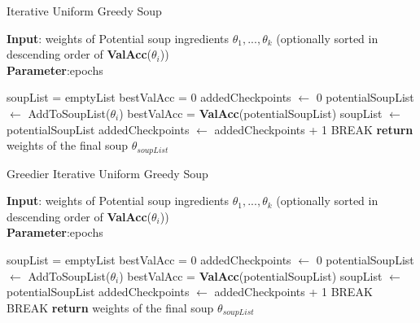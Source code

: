 \documentclass[10pt,twocolumn,letterpaper]{article}
\begin{document}
\begin{algorithm}[!htb]
\caption{Iterative Uniform Greedy Soup}
\label{alg:algorithm1}
\textbf{Input}: weights of Potential soup ingredients ${\theta_1, ..., \theta_k}$ (optionally sorted in descending order of \textbf{ValAcc}($\theta_i$))\\
\textbf{Parameter}:epochs\\
\begin{algorithmic}[1] %
\STATE soupList = emptyList
\STATE bestValAcc = 0
\STATE addedCheckpoints $\leftarrow$ 0
\STATE potentialSoupList $\leftarrow$ AddToSoupList($\theta_i$)
\STATE bestValAcc = \textbf{ValAcc}(potentialSoupList)
\STATE soupList $\leftarrow$ potentialSoupList
\STATE addedCheckpoints $\leftarrow$ addedCheckpoints + 1
\ENDIF
\ENDFOR
{}
\STATE BREAK
\ENDIF
{}
\ENDFOR
\STATE \textbf{return} weights of the final soup $\theta_{soupList}$
\end{algorithmic}
\end{algorithm}
\begin{algorithm}[!htb]
\caption{Greedier Iterative Uniform Greedy Soup}
\label{alg:algorithm2}
\textbf{Input}: weights of Potential soup ingredients ${\theta_1, ..., \theta_k}$ (optionally sorted in descending order of \textbf{ValAcc}($\theta_i$))\\
\textbf{Parameter}:epochs\\
\begin{algorithmic}[1] %
\STATE soupList = emptyList
\STATE bestValAcc = 0
\STATE addedCheckpoints $\leftarrow$ 0
\STATE potentialSoupList $\leftarrow$ AddToSoupList($\theta_i$)
\STATE bestValAcc = \textbf{ValAcc}(potentialSoupList)
\STATE soupList $\leftarrow$ potentialSoupList
\STATE addedCheckpoints $\leftarrow$ addedCheckpoints + 1
\STATE BREAK
\ENDIF
\ENDFOR
\ENDFOR
{}
\STATE BREAK
\ENDIF
{}
\ENDWHILE
\STATE \textbf{return} weights of the final soup $\theta_{soupList}$
\end{algorithmic}
\end{algorithm}
\end{document}
